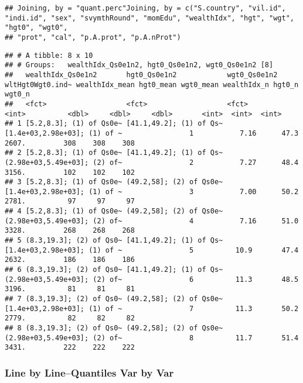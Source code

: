 \documentclass[
]{book}
\newenvironment{Shaded}{\begin{snugshade}}{\end{snugshade}}
\newcommand{\CommentTok}[1]{\textcolor[rgb]{0.56,0.35,0.01}{\textit{#1}}}
\newcommand{\NormalTok}[1]{#1}
\newcommand{\OperatorTok}[1]{\textcolor[rgb]{0.81,0.36,0.00}{\textbf{#1}}}
\begin{document}
\begin{verbatim}
## Joining, by = "quant.perc"Joining, by = c("S.country", "vil.id", "indi.id", "sex", "svymthRound", "momEdu", "wealthIdx", "hgt", "wgt", "hgt0", "wgt0",
## "prot", "cal", "p.A.prot", "p.A.nProt")
\end{verbatim}

\begin{Shaded}
\end{Shaded}

\begin{verbatim}
## # A tibble: 8 x 10
## # Groups:   wealthIdx_Qs0e1n2, hgt0_Qs0e1n2, wgt0_Qs0e1n2 [8]
##   wealthIdx_Qs0e1n2       hgt0_Qs0e1n2            wgt0_Qs0e1n2                 wltHgt0Wgt0.ind~ wealthIdx_mean hgt0_mean wgt0_mean wealthIdx_n hgt0_n wgt0_n
##   <fct>                   <fct>                   <fct>                                   <int>          <dbl>     <dbl>     <dbl>       <int>  <int>  <int>
## 1 [5.2,8.3]; (1) of Qs0e~ [41.1,49.2]; (1) of Qs~ [1.4e+03,2.98e+03]; (1) of ~                1           7.16      47.3     2607.         308    308    308
## 2 [5.2,8.3]; (1) of Qs0e~ [41.1,49.2]; (1) of Qs~ (2.98e+03,5.49e+03]; (2) of~                2           7.27      48.4     3156.         102    102    102
## 3 [5.2,8.3]; (1) of Qs0e~ (49.2,58]; (2) of Qs0e~ [1.4e+03,2.98e+03]; (1) of ~                3           7.00      50.2     2781.          97     97     97
## 4 [5.2,8.3]; (1) of Qs0e~ (49.2,58]; (2) of Qs0e~ (2.98e+03,5.49e+03]; (2) of~                4           7.16      51.0     3328.         268    268    268
## 5 (8.3,19.3]; (2) of Qs0~ [41.1,49.2]; (1) of Qs~ [1.4e+03,2.98e+03]; (1) of ~                5          10.9       47.4     2632.         186    186    186
## 6 (8.3,19.3]; (2) of Qs0~ [41.1,49.2]; (1) of Qs~ (2.98e+03,5.49e+03]; (2) of~                6          11.3       48.5     3196.          81     81     81
## 7 (8.3,19.3]; (2) of Qs0~ (49.2,58]; (2) of Qs0e~ [1.4e+03,2.98e+03]; (1) of ~                7          11.3       50.2     2779.          82     82     82
## 8 (8.3,19.3]; (2) of Qs0~ (49.2,58]; (2) of Qs0e~ (2.98e+03,5.49e+03]; (2) of~                8          11.7       51.4     3431.         222    222    222
\end{verbatim}

\hypertarget{line-by-linequantiles-var-by-var}{%
\subsubsection{Line by Line--Quantiles Var by Var}\label{line-by-linequantiles-var-by-var}}
\end{document}
